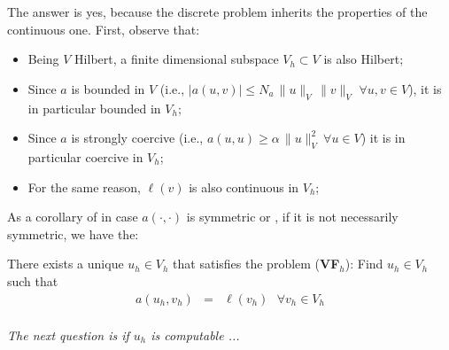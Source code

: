 \bigskip
The answer is yes, because the discrete problem inherits the properties
of the continuous one. First, observe that:
\begin{itemize}
\item Being $V$ Hilbert, a finite dimensional subspace $V_h \subset V$ is
also Hilbert;\\
\item Since $a$ is bounded in $V$
(i.e., $|a(u,v)| \le N_a\,\lVert u \rVert_V \,\lVert v \rVert_V$ $\forall u,v \in V$),
it is in particular bounded in $V_h$;\\
\item Since $a$ is strongly coercive
(i.e., $a(u,u) \ge \alpha\,\lVert u \rVert_V^2~\forall u \in V$) it is in particular
coercive in $V_h$;\\
\item For the same reason, $\ell(v)$ is also continuous in $V_h$;\\
\end{itemize}
As a corollary of  in case $a(\cdot,\cdot)$ is symmetric
or , if it is not necessarily symmetric, we have the:
\begin{corollary}
There exists a unique $u_h \in V_h$
that satisfies the problem (\textbf{VF}$_h$): Find $u_h \in V_h$ such that
\begin{equation}
\left.
\begin{array}{rll}
a(u_h,v_h) & = & \ell(v_h)  ~~~\forall v_h \in V_h \\
\end{array}
\right. \nonumber
\end{equation}
\end{corollary}

\bigskip

\emph{The next question is if $u_h$ is computable ...}

